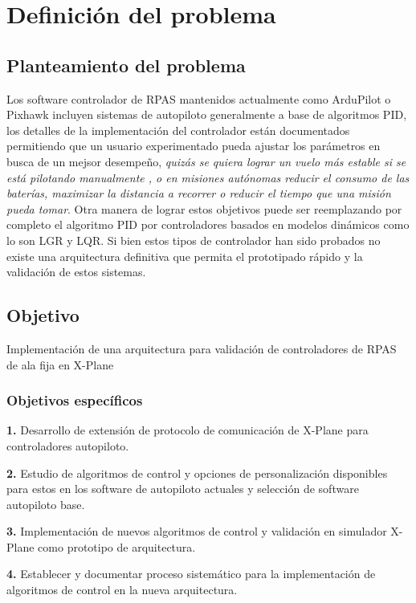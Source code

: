 \chapter{Definición del problema}
\section{Planteamiento del problema}
Los software controlador de RPAS mantenidos actualmente como ArduPilot o Pixhawk incluyen sistemas de autopiloto generalmente a base de algoritmos PID, los detalles de la implementación del controlador están documentados \cite{px4-control-diagram} permitiendo que un usuario experimentado pueda ajustar los parámetros en busca de un mejsor desempeño, \emph{quizás se quiera lograr un vuelo más estable si se está pilotando manualmente \cite{betaflight-pid-tuning}, o en misiones autónomas reducir el consumo de las baterías, maximizar la distancia a recorrer o reducir el tiempo que una misión pueda tomar}. Otra manera de lograr estos objetivos puede ser reemplazando por completo el algoritmo PID por controladores basados en modelos dinámicos como lo son LGR y LQR. Si bien estos tipos de controlador han sido probados \cite{yt-lqr} no existe una arquitectura definitiva que permita el prototipado rápido y la validación de estos sistemas.

\section{Objetivo}

Implementación de una arquitectura para validación de controladores de RPAS de ala fija en X-Plane

\subsection{Objetivos específicos}

\textbf{1.} Desarrollo de extensión de protocolo de comunicación de X-Plane para controladores autopiloto.

\textbf{2.} Estudio de algoritmos de control y opciones de personalización disponibles para estos en los software de autopiloto actuales y selección de software autopiloto base.

\textbf{3.} Implementación de nuevos algoritmos de control y validación en simulador X-Plane como prototipo de arquitectura.

\textbf{4.} Establecer y documentar proceso sistemático para la implementación de algoritmos de control en la nueva arquitectura.

